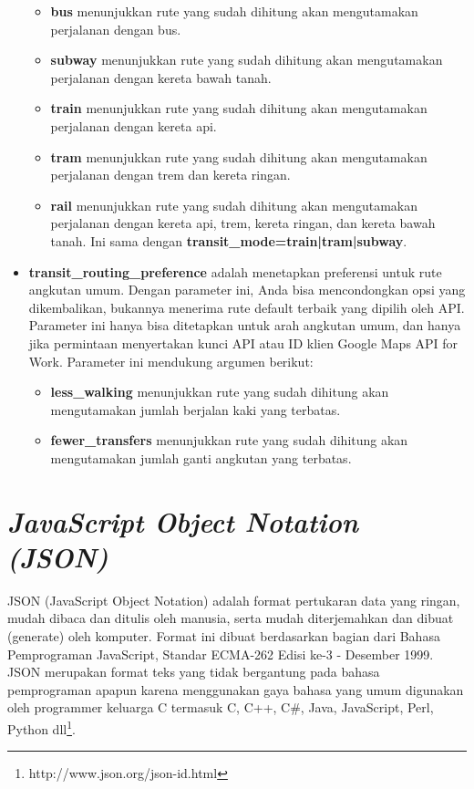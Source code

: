 \begin{itemize}
	\begin{itemize}
		\item \textbf{bus} menunjukkan rute yang sudah dihitung akan mengutamakan perjalanan dengan bus.
		\item \textbf{subway} menunjukkan rute yang sudah dihitung akan mengutamakan perjalanan dengan kereta bawah tanah.
		\item \textbf{train} menunjukkan rute yang sudah dihitung akan mengutamakan perjalanan dengan kereta api.
		\item \textbf{tram} menunjukkan rute yang sudah dihitung akan mengutamakan perjalanan dengan trem dan kereta ringan.
		\item \textbf{rail} menunjukkan rute yang sudah dihitung akan mengutamakan perjalanan dengan kereta api, trem, kereta ringan, dan kereta bawah tanah. Ini sama dengan \textbf{transit\_mode=train|tram|subway}.
	\end{itemize}
	\item \textbf{transit\_routing\_preference} adalah menetapkan preferensi untuk rute angkutan umum. Dengan parameter ini, Anda bisa mencondongkan opsi yang dikembalikan, bukannya menerima rute default terbaik yang dipilih oleh API. Parameter ini hanya bisa ditetapkan untuk arah angkutan umum, dan hanya jika permintaan menyertakan kunci API atau ID klien Google Maps API for Work. Parameter ini mendukung argumen berikut:
	\begin{itemize}
		\item \textbf{less\_walking} menunjukkan rute yang sudah dihitung akan mengutamakan jumlah berjalan kaki yang terbatas.
		\item \textbf{fewer\_transfers} menunjukkan rute yang sudah dihitung akan mengutamakan jumlah ganti angkutan yang terbatas.
	\end{itemize}
\end{itemize}

\section{\textit{JavaScript Object Notation (JSON)}}
\label{sec:json}
JSON (JavaScript Object Notation) adalah format pertukaran data yang ringan, mudah dibaca dan ditulis oleh manusia, serta mudah diterjemahkan dan dibuat (generate) oleh komputer. Format ini dibuat berdasarkan bagian dari Bahasa Pemprograman JavaScript, Standar ECMA-262 Edisi ke-3 - Desember 1999. JSON merupakan format teks yang tidak bergantung pada bahasa pemprograman apapun karena menggunakan gaya bahasa yang umum digunakan oleh programmer keluarga C termasuk C, C++, C\#, Java, JavaScript, Perl, Python dll\footnote{http://www.json.org/json-id.html}.

